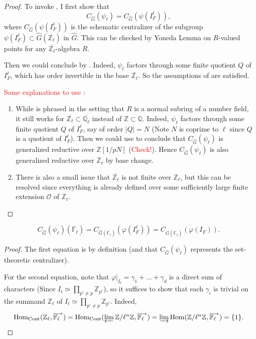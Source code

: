 \begin{proof}
	To invoke \cite[Lemma 3.2]{dat2022ihes}, I first show that $$C_{\hat{G}}(\psi_{\ell})=C_{\hat{G}}(\psi(I_F^{\ell})),$$
	where $C_{\hat{G}}(\psi(I_F^{\ell}))$ is the schematic centralizer of the subgroup $\psi(I_F^{\ell}) \subset \hat{G}(\overline{\mathbb{Z}_{\ell}})$ in $\hat{G}$. This can be checked by Yoneda Lemma on $R$-valued points for any $\overline{\mathbb{Z}_{\ell}}$-algebra $R$.
	
	Then we could conclude by \cite[Lemma 3.2]{dat2022ihes}. Indeed, $\psi_{\ell}$ factors through some finite quotient $Q$ of $I_F^{\ell}$, which has order invertible in the base $\overline{\mathbb{Z}_{\ell}}$. So the assumptions of \cite[Lemma 3.2]{dat2022ihes} are satisfied. 
	
	\textcolor{red}{Some explanations to use \cite[Lemma 3.2]{dat2022ihes}: } 
	\begin{enumerate}
		\item While \cite[Lemma 3.2]{dat2022ihes} is phrased in the setting that $R$ is a normal subring of a number field, it still works for $\overline{\mathbb{Z}_{\ell}} \subset \overline{\mathbb{Q}_{\ell}}$ instead of $\mathbb{Z} \subset \mathbb{Q}$. Indeed, $\psi_{\ell}$ factors through some finite quotient $Q$ of $I_F^{\ell}$, say of order $|Q|=N$ (Note $N$ is coprime to $\ell$ since $Q$ is a quotient of $I_F^{\ell}$). Then we could use \cite[Lemma 3.2]{dat2022ihes} to conclude that $C_{\hat{G}}(\psi_{\ell})$ is generalized reductive over $\mathbb{Z}[1/pN]$ (\textcolor{red}{Check!}). Hence $C_{\hat{G}}(\psi_{\ell})$ is also generalized reductive over $\overline{\mathbb{Z}_{\ell}}$ by base change.
		\item There is also a small issue that $\overline{\mathbb{Z}_{\ell}}$ is not finite over $\mathbb{Z}_{\ell}$, but this can be resolved since everything is already defined over some sufficiently large finite extension $\mathcal{O}$ of $\mathbb{Z}_{\ell}$.
	\end{enumerate}
\end{proof}

\begin{lemma}\label{Lem I_F^ell}
	$$C_{\hat{G}}(\psi_{\ell})(\overline{\mathbb{F}_{\ell}})=C_{\hat{G}(\overline{\mathbb{F}_{\ell}})}(\varphi(I_F^\ell))=C_{\hat{G}(\overline{\mathbb{F}_{\ell}})}(\varphi(I_F)).$$
\end{lemma}

\begin{proof}
	The first equation is by definition (and that $C_{\hat{G}}(\psi_{\ell})$ represents the set-theoretic centralizer).
	
	For the second equation, note that $\varphi|_{I_t}=\gamma_1 + ...+ \gamma_d$ is a direct sum of characters (Since $I_t \simeq \prod_{p'\neq p}\mathbb{Z}_{p'}$), so it suffices to show that each $\gamma_i$ is trivial on the summand $\mathbb{Z}_{\ell}$ of $I_t\simeq \prod_{p'\neq p}\mathbb{Z}_{p'}$.
	Indeed,
	$$\operatorname{\operatorname{Hom}}_{\operatorname{Cont}}(\mathbb{Z}_{\ell}, \overline{\mathbb{F}_{\ell}}^*)=\operatorname{\operatorname{Hom}}_{\operatorname{Cont}}(\varprojlim\mathbb{Z}/\ell^n\mathbb{Z}, \overline{\mathbb{F}_{\ell}}^*)=\varinjlim\operatorname{\operatorname{Hom}}(\mathbb{Z}/\ell^n\mathbb{Z}, \overline{\mathbb{F}_{\ell}}^*)=\{1\}.$$
\end{proof}

